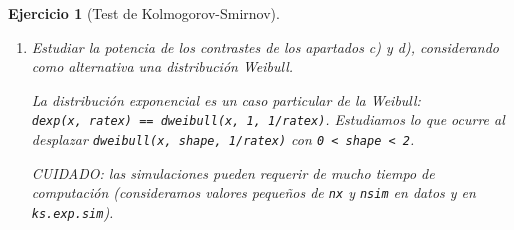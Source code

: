 \documentclass[
  10pt,
]{book}
\newenvironment{Shaded}{\begin{snugshade}}{\end{snugshade}}
\newcommand{\AttributeTok}[1]{\textcolor[rgb]{0.77,0.63,0.00}{#1}}
\newcommand{\CommentTok}[1]{\textcolor[rgb]{0.56,0.35,0.01}{\textit{#1}}}
\newcommand{\ControlFlowTok}[1]{\textcolor[rgb]{0.13,0.29,0.53}{\textbf{#1}}}
\newcommand{\DecValTok}[1]{\textcolor[rgb]{0.00,0.00,0.81}{#1}}
\newcommand{\FloatTok}[1]{\textcolor[rgb]{0.00,0.00,0.81}{#1}}
\newcommand{\FunctionTok}[1]{\textcolor[rgb]{0.00,0.00,0.00}{#1}}
\newcommand{\NormalTok}[1]{#1}
\newcommand{\OtherTok}[1]{\textcolor[rgb]{0.56,0.35,0.01}{#1}}
\newcommand{\SpecialCharTok}[1]{\textcolor[rgb]{0.00,0.00,0.00}{#1}}
\newcommand{\StringTok}[1]{\textcolor[rgb]{0.31,0.60,0.02}{#1}}
\theoremstyle{break}
\newtheorem{exercise}{Ejercicio}[chapter]
\theoremstyle{nonumberplain}
\renewcommand{\CommentTok}[1]{\textcolor[rgb]{0.41,0.41,0.41}{\texttt{#1}}}
\begin{document}
\begin{exercise}[Test de Kolmogorov-Smirnov]
\begin{enumerate}
  \begin{center}\texttt{[image: 07-Monte\_Carlo\_files/figure-latex/unnamed-chunk-59-1]} \texttt{[image: 07-Monte\_Carlo\_files/figure-latex/unnamed-chunk-59-2]} \end{center}
\item
  Estudiar la potencia de los contrastes de los apartados c) y d),
  considerando como alternativa una distribución Weibull.

  La distribución exponencial es un caso particular de la Weibull:
  \texttt{dexp(x,\ ratex)\ ==\ dweibull(x,\ 1,\ 1/ratex)}.
  Estudiamos lo que ocurre al desplazar \texttt{dweibull(x,\ shape,\ 1/ratex)} con \texttt{0\ \textless{}\ shape\ \textless{}\ 2}.

  CUIDADO: las simulaciones pueden requerir de mucho tiempo de computación
  (consideramos valores pequeños de \texttt{nx} y \texttt{nsim} en datos y en \texttt{ks.exp.sim}).

\begin{Shaded}
\end{Shaded}
\end{enumerate}
\end{exercise}
\end{document}
